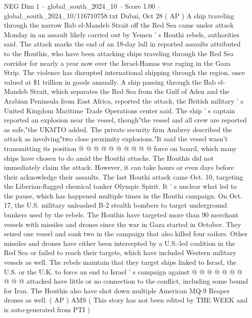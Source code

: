 \begin{textsample}{NEG Dim 1 – global\_south\_2024\_10 – Score 1.00 – global\_south\_2024\_10/116710758.txt}  \label{ex:f1_neg_280}
Dubai, Oct 28 ( AP ) A ship traveling through the narrow Bab el-Mandeb Strait off the Red Sea came under attack Monday in an assault likely carried out by Yemen ' s Houthi rebels, authorities said.
The attack marks the end of an 18-day lull in reported assaults attributed to the Houthis, who have been attacking ships traveling through the Red Sea corridor for nearly a year now over the Israel-Hamas war raging in the Gaza Strip.
The violence has disrupted international shipping through the region, once valued at \$1 trillion in goods annually.
A ship passing through the Bab el-Mandeb Strait, which separates the Red Sea from the Gulf of Aden and the Arabian Peninsula from East Africa, reported the attack, the British military ' s United Kingdom Maritime Trade Operations center said.
The ship ' s captain reported an explosion near the vessel, though"the vessel and all crew are reported as safe,"the UKMTO added.
The private security firm Ambrey described the attack as involving"two close proximity explosions."It said the vessel wasn't transmitting its position @ @ @ @ @ @ @ @ @ @ force on board, which many ships have chosen to do amid the Houthi attacks.
The Houthis did not immediately claim the attack.
However, it can take hours or even days before their acknowledge their assaults.
The last Houthi attack came Oct. 10, targeting the Liberian-flagged chemical tanker Olympic Spirit.
It ' s unclear what led to the pause, which has happened multiple times in the Houthi campaign.
On Oct. 17, the U.S. military unleashed B-2 stealth bombers to target underground bunkers used by the rebels.
The Houthis have targeted more than 90 merchant vessels with missiles and drones since the war in Gaza started in October.
They seized one vessel and sank two in the campaign that also killed four sailors.
Other missiles and drones have either been intercepted by a U.S.-led coalition in the Red Sea or failed to reach their targets, which have included Western military vessels as well.
The rebels maintain that they target ships linked to Israel, the U.S. or the U.K. to force an end to Israel ' s campaign against @ @ @ @ @ @ @ @ @ @ attacked have little or no connection to the conflict, including some bound for Iran.
The Houthis also have shot down multiple American MQ-9 Reaper drones as well. ( AP ) AMS ( This story has not been edited by THE WEEK and is auto-generated from PTI )

\end{textsample}
